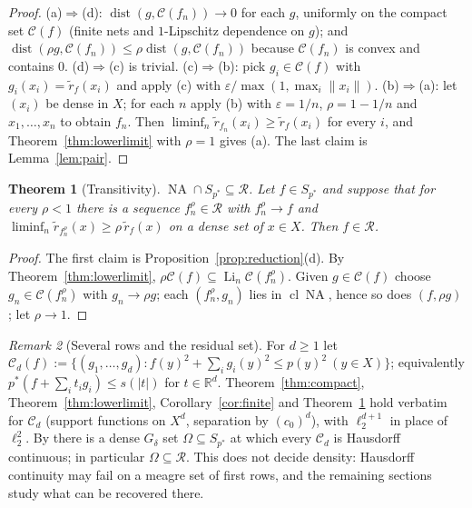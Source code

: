 \documentclass[10pt]{amsart}
\newtheorem{theorem}{Theorem}[section]
\theoremstyle{definition}
\theoremstyle{remark}
\newtheorem{remark}[theorem]{Remark}
\newcommand{\NA}{\operatorname{NA}}
\newcommand{\dist}{\operatorname{dist}}
\newcommand{\R}{\mathbb R}
\newcommand{\Cset}{\mathcal C}
\newcommand{\Li}{\operatorname*{Li}}
\newcommand{\cl}{\operatorname{cl}}
\newcommand{\Rec}{\mathcal R}
\begin{document}
\begin{proof}
(a)$\Rightarrow$(d): $\dist(g,\Cset(f_n))\to0$ for each $g$, uniformly on
the compact set $\Cset(f)$ (finite nets and $1$-Lipschitz dependence on
$g$); and $\dist(\rho g,\Cset(f_n))\le\rho\dist(g,\Cset(f_n))$ because
$\Cset(f_n)$ is convex and contains $0$.  (d)$\Rightarrow$(c) is trivial.
(c)$\Rightarrow$(b): pick $g_i\in\Cset(f)$ with $g_i(x_i)=\tilde r_f(x_i)$
and apply (c) with $\varepsilon/\max(1,\max_i\|x_i\|)$.
(b)$\Rightarrow$(a): let $(x_i)$ be dense in $X$; for each $n$ apply (b)
with $\varepsilon=1/n$, $\rho=1-1/n$ and $x_1,\dots,x_n$ to obtain $f_n$.
Then $\liminf_n\tilde r_{f_n}(x_i)\ge\tilde r_f(x_i)$ for every $i$, and
Theorem~\ref{thm:lowerlimit} with $\rho=1$ gives (a).  The
last claim is Lemma~\ref{lem:pair}.
\end{proof}

\begin{theorem}[Transitivity]\label{thm:transitivity}
$\NA\cap S_{p^*}\subseteq\Rec$.  Let $f\in S_{p^*}$ and suppose that for
every $\rho<1$ there is a sequence $f^\rho_n\in\Rec$ with $f_n^\rho\to f$
and $\liminf_n\tilde r_{f_n^\rho}(x)\ge\rho\,\tilde r_f(x)$ on a dense set
of $x\in X$.  Then $f\in\Rec$.
\end{theorem}

\begin{proof}
The first claim is Proposition~\ref{prop:reduction}(d).  By
Theorem~\ref{thm:lowerlimit}, $\rho\Cset(f)\subseteq\Li_n\Cset(f^\rho_n)$.
Given $g\in\Cset(f)$ choose $g_n\in\Cset(f_n^\rho)$ with $g_n\to\rho g$;
each $(f_n^\rho,g_n)$ lies in $\cl\NA$, hence so does $(f,\rho g)$; let
$\rho\to1$.
\end{proof}

\begin{remark}[Several rows and the residual set]\label{rem:joint}
For $d\ge1$ let
$\Cset_d(f):=\{(g_1,\dots,g_d):f(y)^2+\sum_ig_i(y)^2\le p(y)^2\ (y\in X)\}$;
equivalently $p^*(f+\sum_it_ig_i)\le s(|t|)$ for $t\in\R^d$.
Theorem~\ref{thm:compact}, Theorem~\ref{thm:lowerlimit},
Corollary~\ref{cor:finite} and Theorem~\ref{thm:transitivity} hold verbatim
for $\Cset_d$ (support functions on $X^d$, separation by $(c_0)^d$), with
$\ell_2^{d+1}$ in place of $\ell_2^2$.  By \cite[Theorem~2.2]{PrA} there
is a dense $G_\delta$ set $\Omega\subseteq S_{p^*}$ at which every $\Cset_d$
is Hausdorff continuous; in particular $\Omega\subseteq\Rec$.  This does not
decide density: Hausdorff continuity may fail on a meagre set of first
rows, and the remaining sections study what can be recovered there.
\end{remark}
\end{document}
